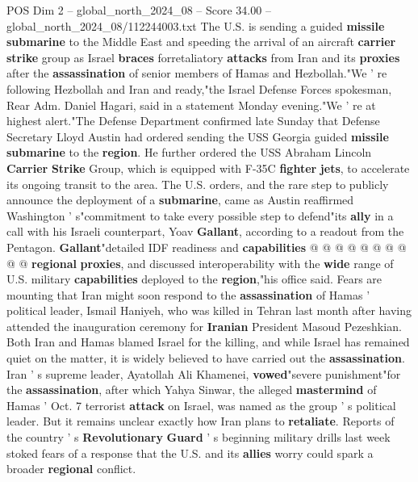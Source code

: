 \begin{textsample}{POS Dim 2 – global\_north\_2024\_08 – Score 34.00 – global\_north\_2024\_08/112244003.txt}  \label{ex:f2_pos_081}
The U.S. is sending a guided \textbf{missile} \textbf{submarine} to the Middle East and speeding the arrival of an aircraft \textbf{carrier} \textbf{strike} group as Israel \textbf{braces} forretaliatory \textbf{attacks} from Iran and its \textbf{proxies} after the \textbf{assassination} of senior members of Hamas and Hezbollah."We ' re following Hezbollah and Iran and ready,"the Israel Defense Forces spokesman, Rear Adm.
Daniel Hagari, said in a statement Monday evening."We ' re at highest alert."The Defense Department confirmed late Sunday that Defense Secretary Lloyd Austin had ordered sending the USS Georgia guided \textbf{missile} \textbf{submarine} to the \textbf{region}.
He further ordered the USS Abraham Lincoln \textbf{Carrier} \textbf{Strike} Group, which is equipped with F-35C \textbf{fighter} \textbf{jets}, to accelerate its ongoing transit to the area.
The U.S. orders, and the rare step to publicly announce the deployment of a \textbf{submarine}, came as Austin reaffirmed Washington ' s"commitment to take every possible step to defend"its \textbf{ally} in a call with his Israeli counterpart, Yoav \textbf{Gallant}, according to a readout from the Pentagon. \textbf{Gallant}"detailed IDF readiness and \textbf{capabilities} @ @ @ @ @ @ @ @ @ @ \textbf{regional} \textbf{proxies}, and discussed interoperability with the \textbf{wide} range of U.S. military \textbf{capabilities} deployed to the \textbf{region},"his office said.
Fears are mounting that Iran might soon respond to the \textbf{assassination} of Hamas ' political leader, Ismail Haniyeh, who was killed in Tehran last month after having attended the inauguration ceremony for \textbf{Iranian} President Masoud Pezeshkian.
Both Iran and Hamas blamed Israel for the killing, and while Israel has remained quiet on the matter, it is widely believed to have carried out the \textbf{assassination}.
Iran ' s supreme leader, Ayatollah Ali Khamenei, \textbf{vowed}"severe punishment"for the \textbf{assassination}, after which Yahya Sinwar, the alleged \textbf{mastermind} of Hamas ' Oct. 7 terrorist \textbf{attack} on Israel, was named as the group ' s political leader.
But it remains unclear exactly how Iran plans to \textbf{retaliate}.
Reports of the country ' s \textbf{Revolutionary} \textbf{Guard} ' s beginning military drills last week stoked fears of a response that the U.S. and its \textbf{allies} worry could spark a broader \textbf{regional} conflict.

\end{textsample}
